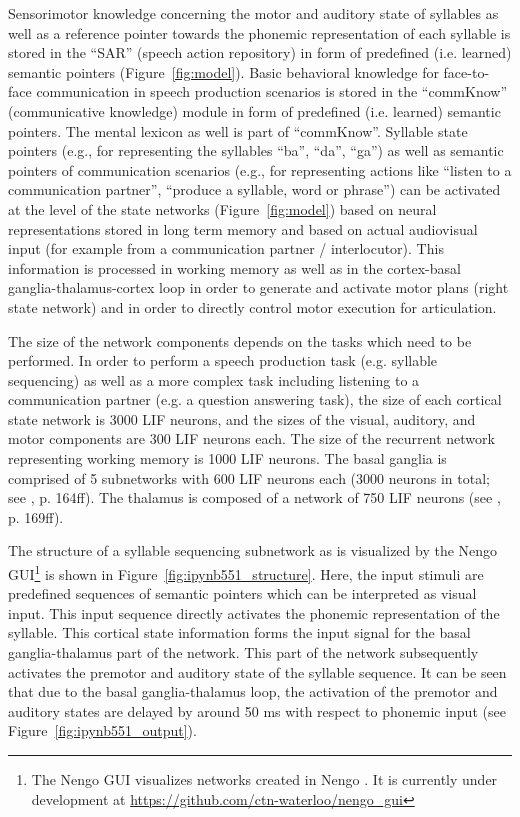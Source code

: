 \documentclass[conference]{IEEEtran}
\begin{document}
Sensorimotor knowledge concerning the motor and auditory state of
syllables as well as a reference pointer towards the
phonemic representation of each syllable
is stored in the ``SAR'' (speech action repository) in form of
predefined (i.e. learned) semantic pointers (Figure~\ref{fig:model}).
Basic behavioral knowledge for face-to-face communication in speech
production scenarios is stored in the  ``commKnow'' (communicative knowledge)
module in form of predefined (i.e. learned) semantic pointers.
The mental lexicon as well is part of ``commKnow''.
Syllable state pointers (e.g., for representing the syllables
``ba'', ``da'', ``ga'') as well as semantic pointers of
communication scenarios (e.g., for representing actions like
``listen to a communication partner'', ``produce a syllable, word or
phrase'') can be activated at the level of the state networks
(Figure~\ref{fig:model})
based on neural representations stored in long term memory
and based on actual audiovisual input (for example from a
communication partner / interlocutor).
This information is processed
in working memory as well as in the
cortex-basal ganglia-thalamus-cortex loop in order to generate and
activate motor plans (right state network) and in order to directly
control motor execution for articulation.

The size of the network components depends on the tasks which need to
be performed. In order to perform a speech production task
(e.g. syllable sequencing) as well as a more complex task including listening to
a communication partner (e.g. a question answering task), the size of
each cortical state network is 3000 LIF neurons,
and the sizes of the visual, auditory, and motor components are
300 LIF neurons each. The size of the recurrent network representing
working memory is 1000 LIF neurons. The basal ganglia is comprised of
5 subnetworks with 600 LIF neurons each (3000 neurons in
total; see \cite{eliasmith2013}, p. 164ff). The thalamus is
composed of a network of 750 LIF neurons (see
\cite{eliasmith2013}, p. 169ff).

The structure of a syllable sequencing subnetwork
as is visualized by the Nengo GUI\footnote{
  The Nengo GUI visualizes networks created in Nengo
  \cite{bekolay2014}. It is currently under development
  at \url{https://github.com/ctn-waterloo/nengo_gui}}
is shown in Figure~\ref{fig:ipynb551_structure}.
Here, the input stimuli are predefined sequences of semantic pointers
which can be interpreted as visual input. This input sequence
directly activates the phonemic representation of the syllable.
This cortical state information forms the input signal for the
basal ganglia-thalamus part of the network. This part of the
network subsequently activates the premotor and auditory state
of the syllable sequence. It can be seen that due to the basal
ganglia-thalamus loop, the activation of the premotor and auditory
states are delayed by around 50 ms with respect to phonemic input
(see Figure~\ref{fig:ipynb551_output}).
\end{document}
